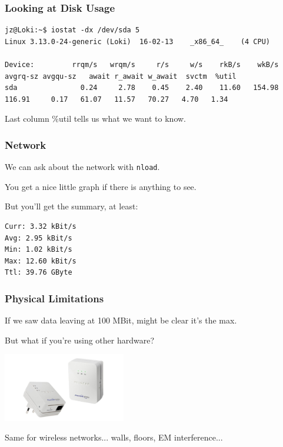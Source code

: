 \begin{frame}[fragile]
\frametitle{Looking at Disk Usage}

{\tiny
\begin{verbatim}
jz@Loki:~$ iostat -dx /dev/sda 5 
Linux 3.13.0-24-generic (Loki) 	16-02-13 	_x86_64_	(4 CPU)

Device:         rrqm/s   wrqm/s     r/s     w/s    rkB/s    wkB/s avgrq-sz avgqu-sz   await r_await w_await  svctm  %util
sda               0.24     2.78    0.45    2.40    11.60   154.98   116.91     0.17   61.07   11.57   70.27   4.70   1.34
\end{verbatim}
}



Last column \%util tells us what we want to know.


\end{frame}



\begin{frame}[fragile]
\frametitle{Network}



We can ask about the network with \texttt{nload}. 
 
You get a nice little graph if there is anything to see. 

But you'll get the summary, at least:

\begin{verbatim}
Curr: 3.32 kBit/s
Avg: 2.95 kBit/s
Min: 1.02 kBit/s
Max: 12.60 kBit/s
Ttl: 39.76 GByte                                                                                       \end{verbatim}

\end{frame}

\begin{frame}
\frametitle{Physical Limitations}

If we saw data leaving at 100 MBit, might be clear it's the max.

But what if you're using other hardware?
\begin{center}
  \includegraphics[width=0.4\textwidth]{images/powerline.jpg}
\end{center}

Same for wireless networks... walls, floors, EM interference...

\end{frame}

